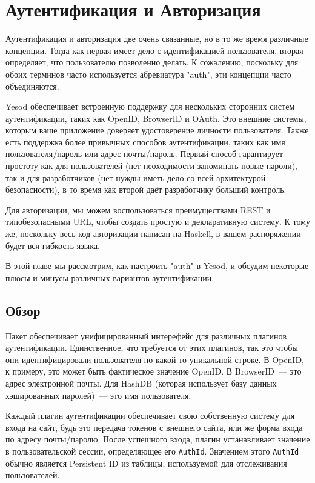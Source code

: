 \chapter{Аутентификация и Авторизация}\label{chap:auth}

Аутентификация и авторизация две очень связанные, но в то же время различные концепции. Тогда как первая имеет дело с идентификацией пользователя, вторая определяет, что пользователю позволенно делать. К сожалению, поскольку для обоих терминов часто используется абревиатура "auth", эти концепции часто объединяются.

Yesod обеспечивает встроенную поддержку для нескольких сторонних систем аутентификации, таких как OpenID, BrowserID и OAuth. Это внешние системы, которым ваше приложение доверяет удостоверение личности пользователя. Также есть поддержка более привычных способов аутентификации, таких как имя пользователя/пароль или адрес почты/пароль. Первый способ гарантирует простоту как для пользователей (нет неоходимости запоминать новые пароли), так и для разработчиков (нет нужды иметь дело со всей архитектурой безопасности), в то время как второй даёт разработчику больший контроль.

Для авторизации, мы можем воспользоваться преимуществами REST и типобезопасными URL, чтобы создать простую и декларативную систему. К тому же, поскольку весь код авторизации написан на Haskell, в вашем распоряжении будет вся гибкость языка.

В этой главе мы рассмотрим, как настроить "auth" в Yesod, и обсудим некоторые плюсы и минусы различных вариантов аутентификации.

\section{Обзор}


Пакет  обеспечивает унифицированный интерефейс для различных плагинов аутентификации. Единственное, что требуется от этих плагинов, так это чтобы они идентифицировали пользователя по какой-то уникальной строке. В OpenID, к примеру, это может быть фактическое значение OpenID. В BrowserID~--- это адрес электронной почты. Для HashDB (которая использует базу данных хэшированных паролей)~--- это имя пользователя.

Каждый плагин аутентификации обеспечивает свою собственную систему для входа на сайт, будь это передача токенов с внешнего сайта, или же форма входа по адресу почты/паролю. После успешного входа, плагин устанавливает значение в пользовательской сессии, определяющее его \lstinline'AuthId'. Значением этого \lstinline'AuthId' обычно является Persistent ID из таблицы, используемой для отслеживания пользователей. 

